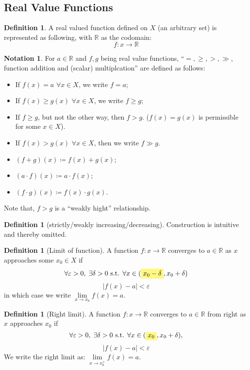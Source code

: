 \documentclass[12pt]{article}
\newcommand{\R}{{\mathbb R}}
\theoremstyle{definition}
\newtheorem{definition}[theorem]{Definition}
\newtheorem{notation}[theorem]{Notation}
\theoremstyle{plain}
\newcommand{\highlight}[1]{%
 \colorbox{yellow!50}{$\displaystyle#1$}}
\begin{document}
\subsection{Real Value Functions}
\setcounter{theorem}{0}

\begin{definition}
    A real valued function defined on $X$ (an arbitrary set) is represented as following, with $\R$ as the 
    codomain:
    \[
        f: x \to \R
    \]
\end{definition}
\begin{notation} For $a \in \R$ and $f,g$ being real value functions, 
    ``$=, \ge , > , \gg$, function addition and (scalar) multiplcation'' are defined as follows:
    \begin{itemize}
        \item If $f(x) =  a$ $\forall x \in X$, we write $f = a$;
        \item If $f(x) \ge g(x)$ $\forall x \in X$, we write $f \ge g$;
        \item If $f\ge g$, but not the other way, then $f > g$. ($f(x) = g(x)$ 
            is permissible for some $x \in X$).
        \item If $f(x) > g(x)$ $\forall x \in X$, then we write $f \gg g$.
        \item $(f+g)(x) \coloneqq  f(x) + g(x)$;
        \item $(a\cdot f) (x) \coloneqq a \cdot f(x)$;
        \item $(f\cdot g) (x) \coloneqq f(x) \cdot g(x)$.
    \end{itemize}
    Note that, $f>g$ is a ``weakly hight'' relationship.
\end{notation}

\begin{definition}
    [strictly/weakly increasing/decreasing] Construction is intuitive and 
    thereby omitted.
\end{definition}

\begin{definition}
    [Limit of function] A function $f : x \to \R$ converges to $a \in \R$ as $x$ 
    approaches some $x_0 \in X$ if 
    \[
        \forall \varepsilon > 0, \; \exists \delta > 0 \text{ s.t. } \forall x  
        \in
        (\highlight{x_0 - \delta}, x_0 + \delta) 
    \]
    \[
        |f(x) - a | < \varepsilon
    \]
    in which case we write $\underset{x \to x_0} \lim f(x) = a$.
\end{definition}
\begin{definition}
    [Right limit]
    A function $f : x \to \R$ converges to $a \in \R$ from right as $x$ 
    approaches $x_0$ if 
    \[
        \forall \varepsilon > 0, \; \exists \delta > 0 \text{ s.t. } \forall x 
        \in (\highlight{x_0}, x_0 + \delta),
    \]
    \[
        |f(x) - a | < \varepsilon
    \]
    We write the right limit as: $\underset{x\to x_0^+} \lim f(x) = a$.
\end{definition}
\end{document}
